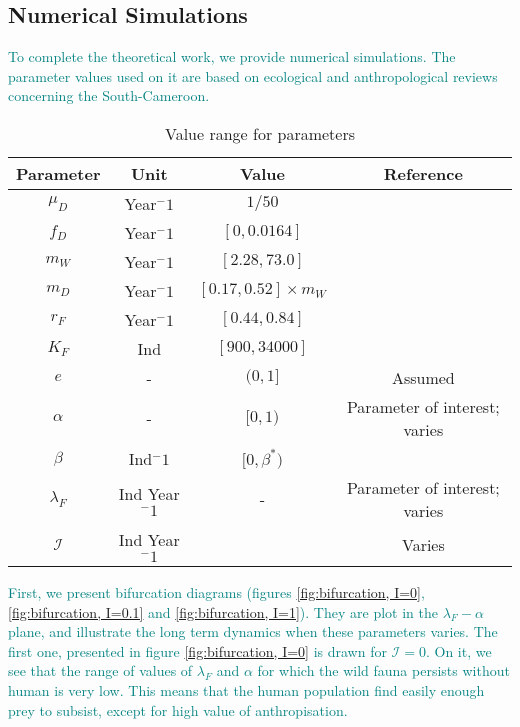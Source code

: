 \documentclass{article}
\newcommand{\lfw}{\lambda_{F}}
\newcommand{\lfw}{\lambda_{F}}
\newcommand{\cI}{\mathcal{I}}
\newcommand{\vquatre}[1]{\textcolor{teal}{#1}}
\theoremstyle{definition}
\theoremstyle{remark}
\begin{document}
\subsection{Numerical Simulations}
\vquatre{To complete the theoretical work, we provide numerical simulations. The parameter values used on it are based on ecological and anthropological reviews concerning the South-Cameroon.}

\begin{table}[ht]
\centering
\begin{tabular}{|c|c|c|c|}
\hline 
Parameter & Unit & Value & Reference \\ 
\hline 
$\mu_D$ & Year$^-1$  & $1/50$ & \cite{ins_demographie}\\
$f_D$ & Year$^-1$ &$[0, 0.0164]$ & \cite{koppert_consommation_1996}\\
$m_W$ &Year$^-1$  &$[2.28, 73.0]$ & \cite{duda_hunting_2017, avila_interpreting_2019}\\
$m_D$ & Year$^-1$  &$[0.17, 0.52] \times m_W$ & \cite{avila_interpreting_2019}\\
$r_F$ & Year$^-1$ & $[0.44, 0.84]$ & \cite{duda_hunting_2017, robinson_intrinsic_1986}\\
$K_F$ & Ind& $[900, 34000]$ & \cite{janson_ecological_1990} \\
$e$ & - & $(0, 1]$ & Assumed\\
$\alpha$ &-&  $[0, 1)$ & Parameter of interest; varies \\
$\beta$ & Ind$^-1$ & $[0, \beta^*)$ &  \\
$\lfw$ & Ind Year$^-1$ & - & Parameter of interest; varies \\
$\mathcal{I}$ &  Ind Year$^-1$ & & Varies \\
\hline
\end{tabular}
\caption{Value range for parameters}
\label{table:param values}
\end{table}

\vquatre{
First, we present bifurcation diagrams (figures \ref{fig:bifurcation, I=0}, \ref{fig:bifurcation, I=0.1} and \ref{fig:bifurcation, I=1}). They are plot in the $\lfw-\alpha$ plane, and illustrate the long term dynamics when these parameters varies.
}
\vquatre{
The first one, presented in figure \ref{fig:bifurcation, I=0} is drawn for $\cI = 0$. On it, we see that the range of values of $\lfw$ and $\alpha$ for which the wild fauna persists without human is very low. This means that the human population find easily enough prey to subsist, except for high value of anthropisation.
}
\end{document}

